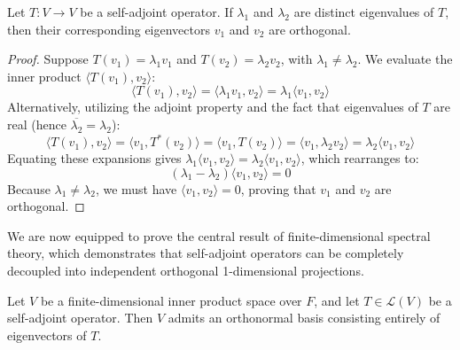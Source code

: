 \begin{lemma}
Let $T: V \to V$ be a self-adjoint operator. If $\lambda_1$ and $\lambda_2$ are distinct eigenvalues of $T$, then their corresponding eigenvectors $v_1$ and $v_2$ are orthogonal.
\end{lemma}

\begin{proof}
Suppose $T(v_1) = \lambda_1 v_1$ and $T(v_2) = \lambda_2 v_2$, with $\lambda_1 \neq \lambda_2$. We evaluate the inner product $\langle T(v_1), v_2 \rangle$:
\[
\langle T(v_1), v_2 \rangle = \langle \lambda_1 v_1, v_2 \rangle = \lambda_1 \langle v_1, v_2 \rangle
\]
Alternatively, utilizing the adjoint property and the fact that eigenvalues of $T$ are real (hence $\overline{\lambda_2} = \lambda_2$):
\[
\langle T(v_1), v_2 \rangle = \langle v_1, T^*(v_2) \rangle = \langle v_1, T(v_2) \rangle = \langle v_1, \lambda_2 v_2 \rangle = \lambda_2 \langle v_1, v_2 \rangle
\]
Equating these expansions gives $\lambda_1 \langle v_1, v_2 \rangle = \lambda_2 \langle v_1, v_2 \rangle$, which rearranges to:
\[
(\lambda_1 - \lambda_2) \langle v_1, v_2 \rangle = 0
\]
Because $\lambda_1 \neq \lambda_2$, we must have $\langle v_1, v_2 \rangle = 0$, proving that $v_1$ and $v_2$ are orthogonal.
\end{proof}

We are now equipped to prove the central result of finite-dimensional spectral theory, which demonstrates that self-adjoint operators can be completely decoupled into independent orthogonal 1-dimensional projections.

\begin{theorem}
Let $V$ be a finite-dimensional inner product space over $F$, and let $T \in \mathcal{L}(V)$ be a self-adjoint operator. Then $V$ admits an orthonormal basis consisting entirely of eigenvectors of $T$.
\end{theorem}

